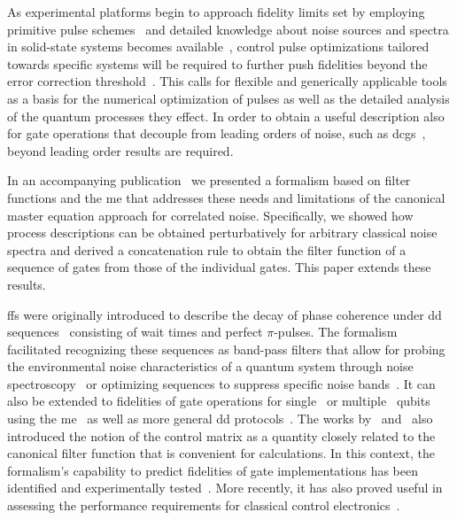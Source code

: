As experimental platforms begin to approach fidelity limits set by employing primitive pulse schemes~\cite{Veldhorst2014,Debnath2016,Yoneda2018} and detailed knowledge about noise sources and spectra in solid-state systems becomes available~\cite{Dial2013,Quintana2017,Malinowski2017}, control pulse optimizations tailored towards specific systems will be required to further push fidelities beyond the error correction threshold~\cite{Barends2014a,Blume-Kohout2017}.
This calls for flexible and generically applicable tools as a basis for the numerical optimization of pulses as well as the detailed analysis of the quantum processes they effect.
In order to obtain a useful description also for gate operations that decouple from leading orders of noise, such as \glspl{dcg}~\cite{Khodjasteh2009}, beyond leading order results are required.

In an accompanying publication~\cite{Cerfontaine2021} we presented a formalism based on filter functions and the \gls{me} that addresses these needs and limitations of the canonical master equation approach for correlated noise.
Specifically, we showed how process descriptions can be obtained perturbatively for arbitrary classical noise spectra and derived a concatenation rule to obtain the filter function of a sequence of gates from those of the individual gates.
This paper extends these results.

\Glspl{ff} were originally introduced to describe the decay of phase coherence under \gls{dd} sequences~\cite{Kofman2001,Martinis2003,Uhrig2007,Cywinski2008} consisting of wait times and perfect $\pi$-pulses.
The formalism facilitated recognizing these sequences as band-pass filters that allow for probing the environmental noise characteristics of a quantum system through noise spectroscopy~\cite{Alvarez2011,Bylander2011,Paz-Silva2017,Malinowski2017} or optimizing sequences to suppress specific noise bands~\cite{Biercuk2009,Uys2009,Soare2014,Malinowski2017}.
It can also be extended to fidelities of gate operations for single~\cite{Green2012,Green2013} or multiple~\cite{Gungordu2018,Ball2020} qubits using the \gls{me}~\cite{Magnus1954,Blanes2009} as well as more general \gls{dd} protocols~\cite{Paz-Silva2014}.
The works by~\citeauthor{Green2013} and~\citeauthor{Clausen2010} also introduced the notion of the control matrix as a quantity closely related to the canonical filter function that is convenient for calculations.
In this context, the formalism's capability to predict fidelities of gate implementations has been identified and experimentally tested~\cite{Green2013,Kabytayev2014,Soare2014,Ball2016}.
More recently, it has also proved useful in assessing the performance requirements for classical control electronics~\cite{VanDijk2019}.

